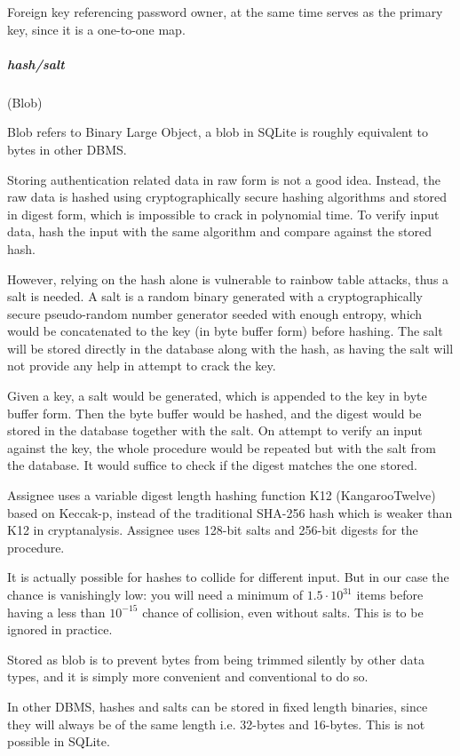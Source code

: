 Foreign key referencing password owner, at the same time serves as the primary
key, since it is a one-to-one map.

\subparagraph{hash/salt}
(Blob) \label{data-layer.design.user.tables.pswd.crypt}

Blob refers to Binary Large Object, a blob in SQLite is roughly equivalent to
bytes in other DBMS.

Storing authentication related data in raw form is not a good idea. Instead, the
raw data is hashed using cryptographically secure hashing algorithms and stored
in digest form, which is impossible to crack in polynomial time. To verify input
data, hash the input with the same algorithm and compare against the stored hash.

However, relying on the hash alone is vulnerable to rainbow table attacks, thus a
salt is needed. A salt is a random binary generated with a cryptographically
secure pseudo-random number generator seeded with enough entropy, which would be
concatenated to the key (in byte buffer form) before hashing. The salt will be
stored directly in the database along with the hash, as having the salt will not
provide any help in attempt to crack the key.

Given a key, a salt would be generated, which is appended to the key in byte buffer
form. Then the byte buffer would be hashed, and the digest would be stored in the
database together with the salt. On attempt to verify an input against the key, the
whole procedure would be repeated but with the salt from the database. It would
suffice to check if the digest matches the one stored.

Assignee uses a variable digest length hashing function K12 (KangarooTwelve)
based on Keccak-p, instead of the traditional SHA-256 hash which is weaker than K12
in cryptanalysis. Assignee uses 128-bit salts and 256-bit digests for the
procedure.

It is actually possible for hashes to collide for different input. But in our case
the chance is vanishingly low: you will need a minimum of $1.5\cdot{}10^{31}$
items before having a less than $10^{-15}$ chance of collision, even without salts.
This is to be ignored in practice.

Stored as blob is to prevent bytes from being trimmed silently by other data
types, and it is simply more convenient and conventional to do so.

\textdagger{} In other DBMS, hashes and salts can be stored in fixed length binaries,
since they will always be of the same length i.e. 32-bytes and 16-bytes. This is
not possible in SQLite.

